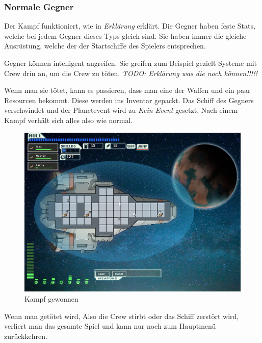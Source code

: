\documentclass[fontsize=12pt,paper=a4,twoside]{scrartcl}
\begin{document}
\subsubsection{Normale Gegner}

Der Kampf funktioniert, wie in \textit{Erklärung} erklärt. Die Gegner haben feste Stats, welche bei jedem Gegner dieses Typs gleich sind. Sie haben immer die gleiche Ausrüstung, welche der der Startschiffe des Spielers entsprechen. 

Gegner können intelligent angreifen. Sie greifen zum Beispiel gezielt Systeme mit Crew drin an, um die Crew zu töten. \textit{TODO: Erklärung was die noch können!!!!!}

Wenn man sie tötet, kann es passieren, dass man eine der Waffen und ein paar Resourcen bekommt. Diese werden ins Inventar gepackt. Das Schiff des Gegners verschwindet und der Planetevent wird zu \textit{Kein Event} gesetzt. Nach einem Kampf verhält sich alles also wie normal. 

\begin{figure}[H]
\centering
\includegraphics[width=1\linewidth]{DasSpiel/Kampf/fightwin.png}
\caption{Kampf gewonnen}
\end{figure}

Wenn man getötet wird, Also die Crew stirbt oder das Schiff zerstört wird, verliert man das gesamte Spiel und kann nur noch zum Hauptmenü zurückkehren. 
\end{document}
